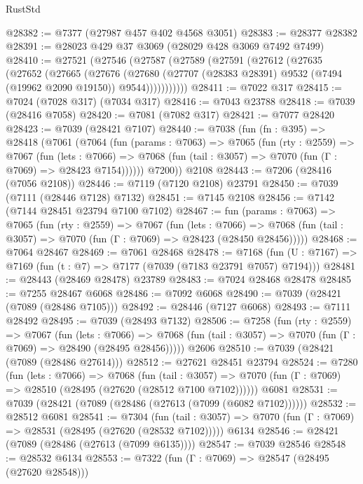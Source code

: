 \begin{lexlean}{RustStd}
\begin{coremodule}
@28382 := @7377 (@27987 @457 @402 @4568 @3051)
@28383 := @28377 @28382
@28391 := @28023 @429 @37 @3069 (@28029 @428 @3069 @7492 @7499)
@28410 := @27521
    (@27546
      (@27587
        (@27589
          (@27591
            (@27612
              (@27635
                (@27652
                  (@27665
                    (@27676
                      (@27680
                        (@27707 (@28383 @28391) @9532 (@7494 (@19962 @2090 @19150)) @9544)))))))))))
@28411 := @7022 @317
@28415 := @7024 (@7028 @317) (@7034 @317)
@28416 := @7043 @23788
@28418 := @7039 (@28416 @7058)
@28420 := @7081 (@7082 @317)
@28421 := @7077 @28420
@28423 := @7039 (@28421 @7107)
@28440 := @7038
    (fun (fn : @395) =>
    @28418
      (@7061
        (@7064
          (fun (params : @7063) =>
          @7065
            (fun (rty : @2559) =>
            @7067
              (fun (lets : @7066) =>
              @7068 (fun (tail : @3057) => @7070 (fun (Γ : @7069) => @28423 @7154))))))
        @7200))
    @2108
@28443 := @7206 (@28416 (@7056 @2108))
@28446 := @7119 (@7120 @2108) @23791
@28450 := @7039 (@7111 (@28446 @7128) @7132)
@28451 := @7145 @2108
@28456 := @7142 (@7144 @28451 @23794 @7100 @7102)
@28467 := fun (params : @7063) =>
  @7065
    (fun (rty : @2559) =>
    @7067
      (fun (lets : @7066) =>
      @7068 (fun (tail : @3057) => @7070 (fun (Γ : @7069) => @28423 (@28450 @28456)))))
@28468 := @7064 @28467
@28469 := @7061 @28468
@28478 := @7168
    (fun (U : @7167) => @7169 (fun (t : @7) => @7177 (@7039 (@7183 @23791 @7057) @7194)))
@28481 := @28443 (@28469 @28478) @23789
@28483 := @7024 @28468 @28478
@28485 := @7255 @28467 @6068
@28486 := @7092 @6068
@28490 := @7039 (@28421 (@7089 (@28486 @7105)))
@28492 := @28446 (@7127 @6068)
@28493 := @7111 @28492
@28495 := @7039 (@28493 @7132)
@28506 := @7258
    (fun (rty : @2559) =>
    @7067
      (fun (lets : @7066) =>
      @7068 (fun (tail : @3057) => @7070 (fun (Γ : @7069) => @28490 (@28495 @28456)))))
    @2606
@28510 := @7039 (@28421 (@7089 (@28486 @27614)))
@28512 := @27621 @28451 @23794
@28524 := @7280
    (fun (lets : @7066) =>
    @7068
      (fun (tail : @3057) =>
      @7070 (fun (Γ : @7069) => @28510 (@28495 (@27620 (@28512 @7100 @7102))))))
    @6081
@28531 := @7039 (@28421 (@7089 (@28486 (@27613 (@7099 (@6082 @7102))))))
@28532 := @28512 @6081
@28541 := @7304
    (fun (tail : @3057) => @7070 (fun (Γ : @7069) => @28531 (@28495 (@27620 (@28532 @7102)))))
    @6134
@28546 := @28421 (@7089 (@28486 (@27613 (@7099 @6135))))
@28547 := @7039 @28546
@28548 := @28532 @6134
@28553 := @7322 (fun (Γ : @7069) => @28547 (@28495 (@27620 @28548)))

\end{coremodule}
\end{lexlean}
